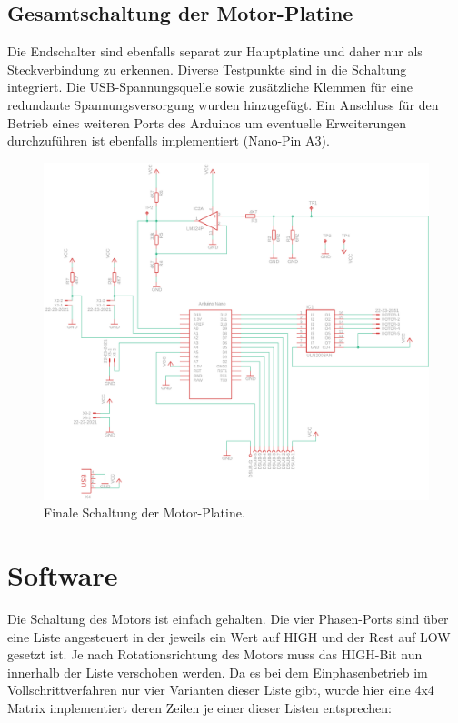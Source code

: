 \documentclass[11pt, titlepage]{report}
\begin{document}
			\subsection{Gesamtschaltung der Motor-Platine}
				Die Endschalter sind ebenfalls separat zur Hauptplatine und daher nur als Steckverbindung zu erkennen. Diverse Testpunkte sind in die Schaltung integriert. Die USB-Spannungsquelle sowie zusätzliche Klemmen für eine redundante Spannungsversorgung wurden hinzugefügt. Ein Anschluss für den Betrieb eines weiteren Ports des Arduinos um eventuelle Erweiterungen durchzuführen ist ebenfalls implementiert (Nano-Pin A3).
				\vspace{3em}
				\begin{figure}[htbp]
					\centering
					\includegraphics[width=\linewidth]{./img/MotorComplete.png}
					\caption{Finale Schaltung der Motor-Platine.
					\label{fig:MotorComp}}			
				\end{figure}
		\newpage
		\section{Software}
		\label{sec:Software}
			Die Schaltung des Motors ist einfach gehalten. Die vier Phasen-Ports sind über eine Liste angesteuert in der jeweils ein Wert auf HIGH und der Rest auf LOW gesetzt ist. Je nach Rotationsrichtung des Motors muss das HIGH-Bit nun innerhalb der Liste verschoben werden. Da es bei dem Einphasenbetrieb im Vollschrittverfahren nur vier Varianten dieser Liste gibt, wurde hier eine 4x4 Matrix implementiert deren Zeilen je einer dieser Listen entsprechen:
\end{document}
